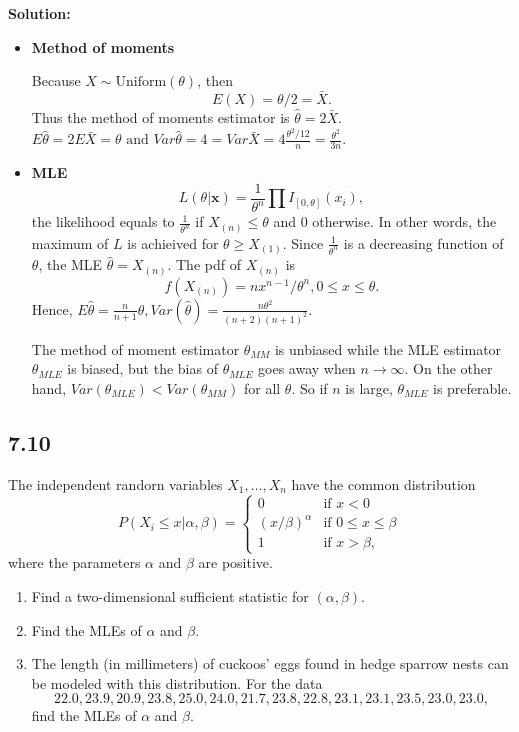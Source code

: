 \documentclass[11pt]{article}
\newcommand{\x}{\mathbf{x}}
\newcommand{\Sol}{\par {\bf Solution:}}
\newcommand{\sample}[1]{#1_1 , \dots , #1_n}
\begin{document}
\Sol
\begin{itemize}
    \item \textbf{Method of moments}
    
    Because $X \sim \text{Uniform}(\theta)$, then
    \[
    E(X) = \theta / 2 = \bar X.
    \]
    Thus the method of moments estimator is $\hat \theta = 2 \bar X$.
    $E\hat\theta = 2E\bar X = \theta \text{ and } Var \hat{\theta} = 4 = Var\bar X = 4 \frac{\theta^2/12}{n} = \frac{\theta^2}{3n}.$
    \item \textbf{MLE}
    \[
    L(\theta | \x) = \frac{1}{\theta^n} \prod I_{[0, \theta]}(x_i),
    \]
    the likelihood equals to $\frac{1}{\theta^n}$ if $X_{(n)} \le \theta$ and 0 otherwise. In other words, the maximum of $L$ is achieived for $\theta \ge X_{(1)}$. Since $\frac{1}{\theta^n}$ is a decreasing function of $\theta$, the MLE $\hat \theta = X_{(n)}$. The pdf of $X_{(n)}$ is 
    \[
    f(X_{(n)}) = nx^{n-1}/\theta^n, 0 \le x \le \theta.
    \]
    Hence, $E\hat{\theta} = \frac{n}{n+1}\theta, Var(\hat{\theta}) = \frac{n\theta^2}{(n+2)(n+1)^2}.$

    The method of moment estimator $\theta_{MM}$ is unbiased while the MLE estimator $\theta_{MLE}$ is biased, but the bias of $\theta_{MLE}$ goes away when $n \to \infty$. On the other hand, $Var(\theta_{MLE}) < Var(\theta_{MM})$ for all $\theta$. So if $n$ is large, $\theta_{MLE}$ is preferable.
\end{itemize}
 
\subsection*{7.10}
The independent randorn variables $\sample{X}$ have the common distribution
\[
P(X_i \le x | \alpha, \beta) = \begin{cases}
    0 & \text{if } x < 0 \\
    (x/\beta)^\alpha & \text{if } 0 \le x \le \beta \\
    1 & \text{if } x > \beta,
\end{cases}
\]
where the parameters $\alpha$ and $\beta$ are positive.
\begin{enumerate}[label=(\alph*)]
    \item Find a two-dimensional sufficient statistic for $(\alpha, \beta)$.
    \item Find the MLEs of $\alpha$ and $\beta$.
    \item The length (in millimeters) of cuckoos' eggs found in hedge sparrow nests can be modeled with this distribution. For the data
    \[
    22.0, 23.9, 20.9, 23.8, 25.0, 24.0, 21 .7, 23.8, 22.8, 23. 1 , 23. 1 , 23.5, 23.0, 23.0,
    \]
    find the MLEs of $\alpha$ and $\beta$.
\end{enumerate}
\end{document}
